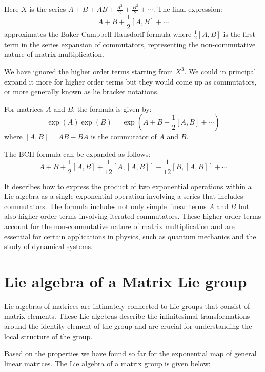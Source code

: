 \documentclass{article}
\begin{document}
Here \( X \) is the series \( A + B + AB + \frac{A^2}{2} + \frac{B^2}{2} + \cdots \). The final expression:
\[
    A + B + \frac{1}{2}[A,B]  + \cdots
\]
approximates the Baker-Campbell-Hausdorff formula where \( \frac{1}{2}[A,B] \) is the first term in the series expansion of commutators, representing the non-commutative nature of matrix multiplication.

We have ignored the higher order terms starting from \( X^3 \). We could in principal expand it more for higher order terms but they would come up as commutators, or more generally known as lie bracket notations.

\begin{theorem}
For matrices \(A\) and \(B\), the formula is given by:
\[
\exp(A) \exp(B) = \exp \left( A + B + \frac{1}{2}[A, B] + \cdots \right)
\]    
where \([A, B] = AB - BA\) is the commutator of \(A\) and \(B\). 

The BCH formula can be expanded as follows:
\[
A + B + \frac{1}{2}[A, B] + \frac{1}{12}[A, [A, B]] - \frac{1}{12}[B, [A, B]] + \cdots
\]

\end{theorem}

It describes how to express the product of two exponential operations within a Lie algebra as a single exponential operation involving a series that includes commutators. The formula includes not only simple linear terms \(A\) and \(B\) but also higher order terms involving iterated commutators. These higher order terms account for the non-commutative nature of matrix multiplication and are essential for certain applications in physics, such as quantum mechanics and the study of dynamical systems.

\section{Lie algebra of a Matrix Lie group}

Lie algebras of matrices are intimately connected to Lie groups that consist of matrix elements. These Lie algebras describe the infinitesimal transformations around the identity element of the group and are crucial for understanding the local structure of the group.

Based on the properties we have found so far for the exponential map of general linear  matrices. The Lie algebra of a matrix group is given below: 
\end{document}
